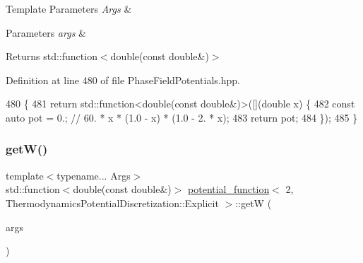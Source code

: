 \begin{DoxyTemplParams}{Template Parameters}
{\em Args} & \\
\hline
\end{DoxyTemplParams}

\begin{DoxyParams}{Parameters}
{\em args} & \\
\hline
\end{DoxyParams}
\begin{DoxyReturn}{Returns}
std\+::function$<$double(const double\&)$>$ 
\end{DoxyReturn}


Definition at line 480 of file Phase\+Field\+Potentials.\+hpp.


\begin{DoxyCode}
480                                                         \{
481     \textcolor{keywordflow}{return} std::function<double(const double&)>([](\textcolor{keywordtype}{double} x) \{
482       \textcolor{keyword}{const} \textcolor{keyword}{auto} pot = 0.;  \textcolor{comment}{// 60. * x * (1.0 - x) * (1.0 - 2. * x);}
483       \textcolor{keywordflow}{return} pot;
484     \});
485   \}
\end{DoxyCode}
\mbox{\label{structpotential__function_3_012_00_01ThermodynamicsPotentialDiscretization_1_1Explicit_01_4_a69caeda1a9238a964b1d05d5bd3ad3ee}} 
\subsubsection{\texorpdfstring{get\+W()}{getW()}}
{\footnotesize\ttfamily template$<$typename... Args$>$ \\
std\+::function$<$double(const double\&)$>$ \hyperlink{structpotential__function}{potential\+\_\+function}$<$ 2, Thermodynamics\+Potential\+Discretization\+::\+Explicit $>$\+::getW (\begin{DoxyParamCaption}\item[{Args...}]{args }\end{DoxyParamCaption})\hspace{0.3cm}{\ttfamily [inline]}}




